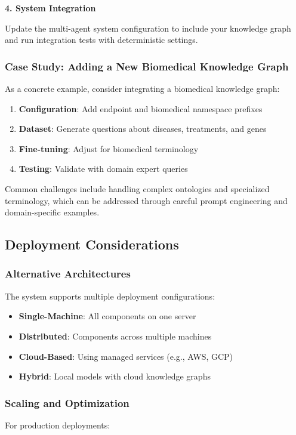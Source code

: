 \textbf{4. System Integration}

Update the multi-agent system configuration to include your knowledge graph and run integration tests with deterministic settings.

\subsubsection{Case Study: Adding a New Biomedical Knowledge Graph}

As a concrete example, consider integrating a biomedical knowledge graph:

\begin{enumerate}
    \item \textbf{Configuration}: Add endpoint and biomedical namespace prefixes
    \item \textbf{Dataset}: Generate questions about diseases, treatments, and genes
    \item \textbf{Fine-tuning}: Adjust for biomedical terminology
    \item \textbf{Testing}: Validate with domain expert queries
\end{enumerate}

Common challenges include handling complex ontologies and specialized terminology, which can be addressed through careful prompt engineering and domain-specific examples.

\subsection{Deployment Considerations}
\label{subsec:deployment}

\subsubsection{Alternative Architectures}
The system supports multiple deployment configurations:

\begin{itemize}
    \item \textbf{Single-Machine}: All components on one server
    \item \textbf{Distributed}: Components across multiple machines
    \item \textbf{Cloud-Based}: Using managed services (e.g., AWS, GCP)
    \item \textbf{Hybrid}: Local models with cloud knowledge graphs
\end{itemize}

\subsubsection{Scaling and Optimization}
For production deployments:

